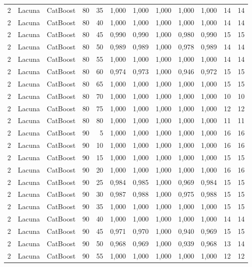 \begin{longtable}{@{}rllrrrrrrrrr@{}}
2 & Lacuna & CatBoost & 80 & 35 & 1,000 & 1,000 & 1,000 & 1,000 & 1,000 & 14 & 14 \\
2 & Lacuna & CatBoost & 80 & 40 & 1,000 & 1,000 & 1,000 & 1,000 & 1,000 & 14 & 14 \\
2 & Lacuna & CatBoost & 80 & 45 & 0,990 & 0,990 & 1,000 & 0,980 & 0,990 & 15 & 15 \\
2 & Lacuna & CatBoost & 80 & 50 & 0,989 & 0,989 & 1,000 & 0,978 & 0,989 & 14 & 14 \\
2 & Lacuna & CatBoost & 80 & 55 & 1,000 & 1,000 & 1,000 & 1,000 & 1,000 & 14 & 14 \\
2 & Lacuna & CatBoost & 80 & 60 & 0,974 & 0,973 & 1,000 & 0,946 & 0,972 & 15 & 15 \\
2 & Lacuna & CatBoost & 80 & 65 & 1,000 & 1,000 & 1,000 & 1,000 & 1,000 & 15 & 15 \\
2 & Lacuna & CatBoost & 80 & 70 & 1,000 & 1,000 & 1,000 & 1,000 & 1,000 & 10 & 10 \\
2 & Lacuna & CatBoost & 80 & 75 & 1,000 & 1,000 & 1,000 & 1,000 & 1,000 & 12 & 12 \\
2 & Lacuna & CatBoost & 80 & 80 & 1,000 & 1,000 & 1,000 & 1,000 & 1,000 & 11 & 11 \\
2 & Lacuna & CatBoost & 90 & 5 & 1,000 & 1,000 & 1,000 & 1,000 & 1,000 & 16 & 16 \\
2 & Lacuna & CatBoost & 90 & 10 & 1,000 & 1,000 & 1,000 & 1,000 & 1,000 & 16 & 16 \\
2 & Lacuna & CatBoost & 90 & 15 & 1,000 & 1,000 & 1,000 & 1,000 & 1,000 & 15 & 15 \\
2 & Lacuna & CatBoost & 90 & 20 & 1,000 & 1,000 & 1,000 & 1,000 & 1,000 & 16 & 16 \\
2 & Lacuna & CatBoost & 90 & 25 & 0,984 & 0,985 & 1,000 & 0,969 & 0,984 & 15 & 15 \\
2 & Lacuna & CatBoost & 90 & 30 & 0,987 & 0,988 & 1,000 & 0,975 & 0,988 & 15 & 15 \\
2 & Lacuna & CatBoost & 90 & 35 & 1,000 & 1,000 & 1,000 & 1,000 & 1,000 & 15 & 15 \\
2 & Lacuna & CatBoost & 90 & 40 & 1,000 & 1,000 & 1,000 & 1,000 & 1,000 & 14 & 14 \\
2 & Lacuna & CatBoost & 90 & 45 & 0,971 & 0,970 & 1,000 & 0,940 & 0,969 & 15 & 15 \\
2 & Lacuna & CatBoost & 90 & 50 & 0,968 & 0,969 & 1,000 & 0,939 & 0,968 & 13 & 14 \\
2 & Lacuna & CatBoost & 90 & 55 & 1,000 & 1,000 & 1,000 & 1,000 & 1,000 & 12 & 12 \\

\end{longtable}
